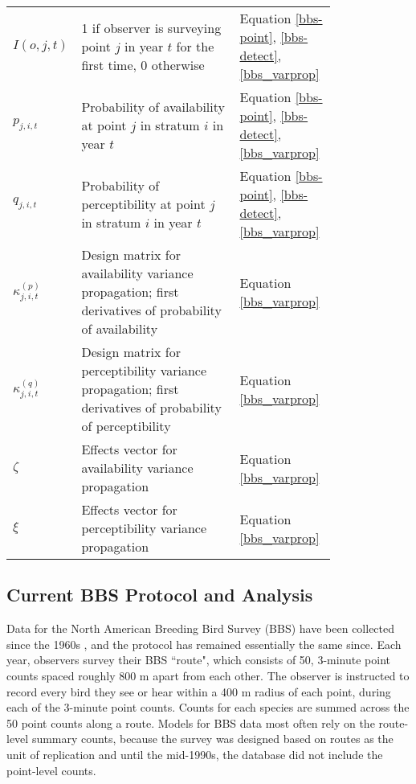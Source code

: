 \documentclass[12pt]{article}
\begin{document}
\begin{table}[ht]
\begin{tabular}[t]{l>{\raggedright}p{0.5\linewidth}>{\raggedright\arraybackslash}p{0.3\linewidth}}
		$I(o,j,t)$&1 if observer is surveying point $j$ in year $t$ for the first time, 0 otherwise&Equation \ref{bbs-point}, \ref{bbs-detect}, \ref{bbs_varprop}\\
		$p_{j,i,t}$&Probability of availability at point $j$ in stratum $i$ in year $t$&Equation \ref{bbs-point}, \ref{bbs-detect}, \ref{bbs_varprop}\\
		$q_{j,i,t}$&Probability of perceptibility at point $j$ in stratum $i$ in year $t$&Equation \ref{bbs-point}, \ref{bbs-detect}, \ref{bbs_varprop}\\
		$\kappa_{j,i,t}^{(p)}$&Design matrix for availability variance propagation; first derivatives of probability of availability \citep{bravington_variance_2021}&Equation \ref{bbs_varprop}\\
		$\kappa_{j,i,t}^{(q)}$&Design matrix for perceptibility variance propagation; first derivatives of probability of perceptibility \citep{bravington_variance_2021}&Equation \ref{bbs_varprop}\\
		$\zeta$&Effects vector for availability variance propagation \citep{bravington_variance_2021}&Equation \ref{bbs_varprop}\\
		$\xi$&Effects vector for perceptibility variance propagation \citep{bravington_variance_2021}&Equation \ref{bbs_varprop}\\
		\hline
	\end{tabular}
\end{table}%

\subsection{Current BBS Protocol and Analysis}

\par Data for the North American Breeding Bird Survey (BBS) have been collected since the 1960s \citep{hudson_role_2017, sauer_first_2017}, and the protocol has remained essentially the same since. 
Each year, observers survey their BBS ``route", which consists of 50, 3-minute point counts spaced roughly 800 m apart from each other. 
The observer is instructed to record every bird they see or hear within a 400 m radius of each point, during each of the 3-minute point counts. 
Counts for each species are summed across the 50 point counts along a route.
Models for BBS data most often rely on the route-level summary counts, because the survey was designed based on routes as the unit of replication and until the mid-1990s, the database did not include the point-level counts.
\end{document}
